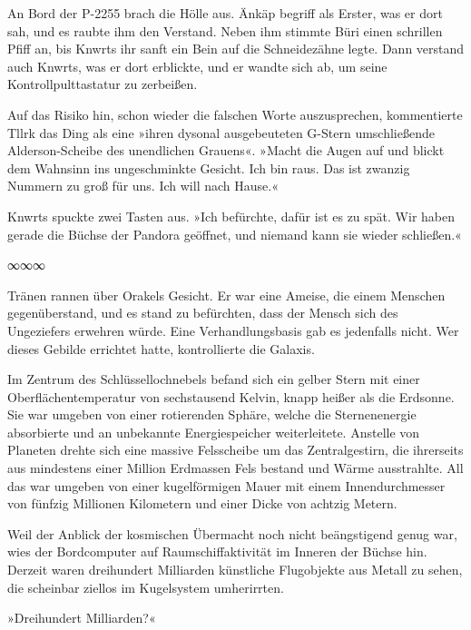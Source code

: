 An Bord der P-2255 brach die Hölle aus. Änkäp begriff als Erster, was er dort sah, und es raubte ihm den Verstand. Neben ihm stimmte Büri einen schrillen Pfiff an, bis Knwrts ihr sanft ein Bein auf die Schneidezähne legte. Dann verstand auch Knwrts, was er dort erblickte, und er wandte sich ab, um seine Kontrollpulttastatur zu zerbeißen.

Auf das Risiko hin, schon wieder die falschen Worte auszusprechen, kommentierte Tllrk das Ding als eine »ihren dysonal ausgebeuteten G-Stern umschließende Alderson-Scheibe des unendlichen Grauens«. »Macht die Augen auf und blickt dem Wahnsinn ins ungeschminkte Gesicht. Ich bin raus. Das ist zwanzig Nummern zu groß für uns. Ich will nach Hause.«

Knwrts spuckte zwei Tasten aus. »Ich befürchte, dafür ist es zu spät. Wir haben gerade die Büchse der Pandora geöffnet, und niemand kann sie wieder schließen.«

\begin{center}
∞∞∞
\end{center}

Tränen rannen über Orakels Gesicht. Er war eine Ameise, die einem Menschen gegenüberstand, und es stand zu befürchten, dass der Mensch sich des Ungeziefers erwehren würde. Eine Verhandlungsbasis gab es jedenfalls nicht. Wer dieses Gebilde errichtet hatte, kontrollierte die Galaxis.

Im Zentrum des Schlüssellochnebels befand sich ein gelber Stern mit einer Oberflächentemperatur von sechstausend Kelvin, knapp heißer als die Erdsonne. Sie war umgeben von einer rotierenden Sphäre, welche die Sternenenergie absorbierte und an unbekannte Energiespeicher weiterleitete. Anstelle von Planeten drehte sich eine massive Felsscheibe um das Zentralgestirn, die ihrerseits aus mindestens einer Million Erdmassen Fels bestand und Wärme ausstrahlte. All das war umgeben von einer kugelförmigen Mauer mit einem Innendurchmesser von fünfzig Millionen Kilometern und einer Dicke von achtzig Metern.

Weil der Anblick der kosmischen Übermacht noch nicht beängstigend genug war, wies der Bordcomputer auf Raumschiffaktivität im Inneren der Büchse hin. Derzeit waren dreihundert Milliarden künstliche Flugobjekte aus Metall zu sehen, die scheinbar ziellos im Kugelsystem umherirrten.

»Dreihundert Milliarden?«


